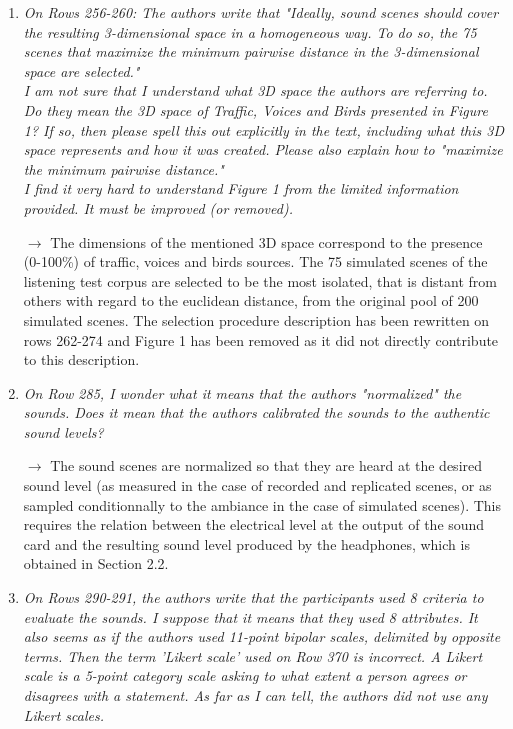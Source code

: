 \documentclass[10pt]{article}
\begin{document}
\begin{enumerate}
\item \emph{On Rows 256-260: The authors write that "Ideally, sound scenes should cover the resulting 3-dimensional space in a homogeneous way. To do so, the 75 scenes that maximize the minimum pairwise distance in the 3-dimensional space are selected."\\
I am not sure that I understand what 3D space the authors are referring to. Do they mean the 3D space of Traffic, Voices and Birds presented in Figure 1? If so, then please spell this out explicitly in the text, including what this 3D space represents and how it was created. Please also explain how to "maximize the minimum pairwise distance."\\
I find it very hard to understand Figure 1 from the limited information provided. It must be improved (or removed).}

$\rightarrow$ The dimensions of the mentioned 3D space correspond to the presence (0-100\%) of traffic, voices and birds sources. The 75 simulated scenes of the listening test corpus are selected to be the most isolated, that is distant from others with regard to the euclidean distance, from the original pool of 200 simulated scenes. The selection procedure description has been rewritten on rows 262-274 and Figure 1 has been removed as it did not directly contribute to this description.

\item \emph{On Row 285, I wonder what it means that the authors "normalized" the sounds. Does it mean that the authors calibrated the sounds to the authentic sound levels?}

$\rightarrow$ The sound scenes are normalized so that they are heard at the desired sound level (as measured in the case of recorded and replicated scenes, or as sampled conditionnally to the ambiance in the case of simulated scenes). This requires the relation between the electrical level at the output of the sound card and the resulting sound level produced by the headphones, which is obtained in Section 2.2.

\item \emph{On Rows 290-291, the authors write that the participants used 8 criteria to evaluate the sounds. I suppose that it means that they used 8 attributes. It also seems as if the authors used 11-point bipolar scales, delimited by opposite terms. Then the term 'Likert scale' used on Row 370 is incorrect. A Likert scale is a 5-point category scale asking to what extent a person agrees or disagrees with a statement. As far as I can tell, the authors did not use any Likert scales.}


\end{enumerate}
\end{document}
